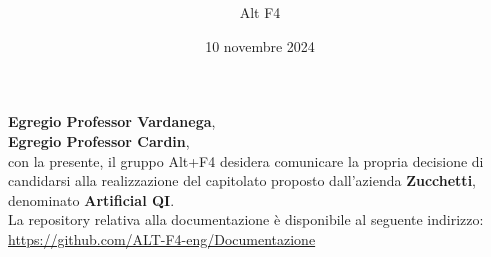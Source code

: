 \documentclass[a4paper, 12pt]{article}
\title{\Huge \textbf{\titolo}}
\author{\Large{Alt} \raisebox{0.3ex}{\normalsize  +} \Large{F4}}
\date{10 novembre 2024}
\def\logo{../Immagini/logo.jpeg}%
\begin{document}
\begin{titlepage}      
    \maketitle
    \thispagestyle{empty}  

\end{titlepage}

\newpage

\textbf{Egregio Professor Vardanega},\\
\textbf{Egregio Professor Cardin}, \\
con la presente, il gruppo Alt+F4 desidera comunicare la propria decisione di candidarsi alla realizzazione del capitolato proposto dall’azienda \textbf{Zucchetti}, denominato \textbf{Artificial QI}.\\

La repository relativa alla documentazione è disponibile al seguente indirizzo:\\

\href{https://github.com/ALT-F4-eng/Documentazione}{https://github.com/ALT-F4-eng/Documentazione}\\
\end{document}
